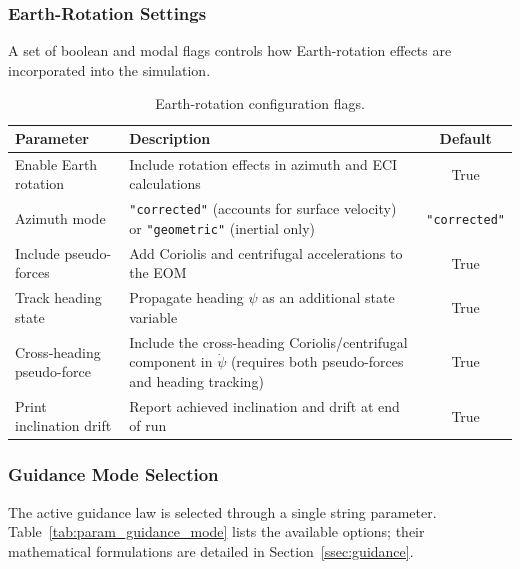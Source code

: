 \subsubsection{Earth-Rotation Settings}

A set of boolean and modal flags controls how Earth-rotation effects are
incorporated into the simulation.

\begin{table}[htbp]
  \centering
  \caption{Earth-rotation configuration flags.}
  \label{tab:param_earthrot}
  \begin{tabular}{l l c}
    \toprule
    \textbf{Parameter} & \textbf{Description} & \textbf{Default} \\
    \midrule
    Enable Earth rotation
      & Include rotation effects in azimuth and ECI calculations
      & True \\
    Azimuth mode
      & \texttt{"corrected"} (accounts for surface velocity) or
        \texttt{"geometric"} (inertial only)
      & \texttt{"corrected"} \\
    Include pseudo-forces
      & Add Coriolis and centrifugal accelerations to the EOM
      & True \\
    Track heading state
      & Propagate heading $\psi$ as an additional state variable
      & True \\
    Cross-heading pseudo-force
      & Include the cross-heading Coriolis/centrifugal component
        in $\dot\psi$ (requires both pseudo-forces and heading tracking)
      & True \\
    Print inclination drift
      & Report achieved inclination and drift at end of run
      & True \\
    \bottomrule
  \end{tabular}
\end{table}

\subsubsection{Guidance Mode Selection}

The active guidance law is selected through a single string parameter.
Table~\ref{tab:param_guidance_mode} lists the available options; their
mathematical formulations are detailed in Section~\ref{ssec:guidance}.

